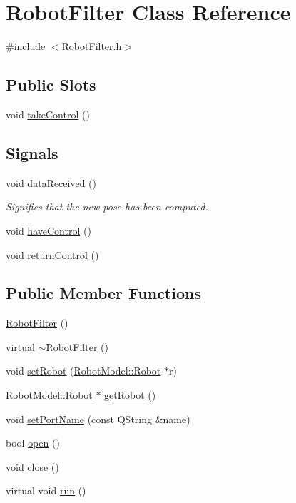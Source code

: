 \hypertarget{class_robot_filter}{
\section{RobotFilter Class Reference}
\label{class_robot_filter}
}


{\ttfamily \#include $<$RobotFilter.h$>$}\subsection*{Public Slots}
\begin{DoxyCompactItemize}
\item 
void \hyperlink{class_robot_filter_a63edcdd59785cfbf70d099ba14766180}{takeControl} ()
\end{DoxyCompactItemize}
\subsection*{Signals}
\begin{DoxyCompactItemize}
\item 
void \hyperlink{class_robot_filter_a98520b2362e5f41732c0ce9ea06ec1a7}{dataReceived} ()
\begin{DoxyCompactList}\small\item\em Signifies that the new pose has been computed. \item\end{DoxyCompactList}\item 
void \hyperlink{class_robot_filter_abe61e61fc213e9c407bade47a0cf6fc1}{haveControl} ()
\item 
void \hyperlink{class_robot_filter_a7027209482d22e7e7650fda0311ff7ec}{returnControl} ()
\end{DoxyCompactItemize}
\subsection*{Public Member Functions}
\begin{DoxyCompactItemize}
\item 
\hyperlink{class_robot_filter_ac8b34c364fc76fedb9f44ab6c551b8fd}{RobotFilter} ()
\item 
virtual \hyperlink{class_robot_filter_a023b1465a80479e54bd4a47ca958a5af}{$\sim$RobotFilter} ()
\item 
void \hyperlink{class_robot_filter_a2044bbedf65a8ec40c65650d295d6376}{setRobot} (\hyperlink{class_robot_model_1_1_robot}{RobotModel::Robot} $\ast$r)
\item 
\hyperlink{class_robot_model_1_1_robot}{RobotModel::Robot} $\ast$ \hyperlink{class_robot_filter_af5f8ca3a34dc3e2d2f7a1e8b54f794a5}{getRobot} ()
\item 
void \hyperlink{class_robot_filter_a870f04dabea13ff84cd2ba5d0d172d44}{setPortName} (const QString \&name)
\item 
bool \hyperlink{class_robot_filter_ae6aa98d5ac9ff1dbb7d4d2881dfa70bf}{open} ()
\item 
void \hyperlink{class_robot_filter_af727d2bba23531237fdd21ac198a4726}{close} ()
\item 
virtual void \hyperlink{class_robot_filter_ab9eb900478b4c2836666570c79f9d1f2}{run} ()
\end{DoxyCompactItemize}
